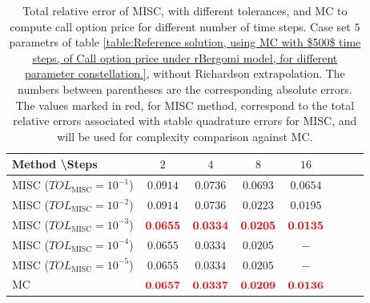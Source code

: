 %
%
%
\begin{table}[h!]
	\centering
	\begin{tabular}{l*{6}{c}r}
		Method \textbackslash  Steps            & $2$ & $4$ & $8$ & $16$  \\
		\hline
		MISC ($TOL_{\text{MISC}}=10^{-1}$)  & $\mathbf{0.0914}$ & $\mathbf{0.0736}$& $\mathbf{ 0.0693}$ & $\mathbf{ 0.0654}$   \\
		MISC ($TOL_{\text{MISC}}=10^{-2}$)  &  $\mathbf{0.0914}$& $\mathbf{0.0736}$& $\mathbf{ 0.0223}$ & $\mathbf{ 0.0195}$  \\
		MISC ($TOL_{\text{MISC}}=10^{-3}$)  &  $\mathbf{{\color{red}0.0655}}$& $\mathbf{{\color{red}0.0334}}$& $\mathbf{{\color{red}0.0205}}$  & $\mathbf{ {\color{red}0.0135}}$  \\
		MISC ($TOL_{\text{MISC}}=10^{-4}$)  &  $\mathbf{0.0655}$& $\mathbf{0.0334}$& $\mathbf{0.0205}$ & $\mathbf{ -}$ \\
		MISC ($TOL_{\text{MISC}}=10^{-5}$)  &  $\mathbf{0.0655}$ & $\mathbf{0.0334}$& $\mathbf{0.0205}$ & $\mathbf{ -}$ 
		\\
		\hline
		MC    & $\mathbf{{\color{red}0.0657}}$  & $\mathbf{ {\color{red}0.0337}}$  & $\mathbf{{\color{red}0.0209}}$ & $\mathbf{ {\color{red}0.0136}}$  \\		
		\hline
	\end{tabular}
	\caption{Total relative error of MISC, with  different tolerances,  and MC to compute call option price  for different number of time steps. Case  set $5$ parametrs of table \ref{table:Reference solution, using MC with $500$ time steps, of Call option price under rBergomi model, for different parameter constellation.}, without Richardson extrapolation. The numbers between parentheses are the corresponding absolute errors. The values marked in red, for MISC method, correspond to the total relative errors associated with  stable quadrature errors for MISC, and will be used for complexity comparison against MC.}
	\label{Total error of MISC and MC to compute Call option price of the different tolerances for different number of time steps. Case set 5, without Richardson extrapolation. The numbers between parentheses are the corresponding absolute errors.}
\end{table}


